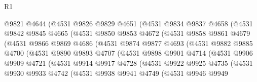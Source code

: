 \begin{lexlean}{R1}
\begin{coremodule}
                  @9821
                  @4644
                  (@4531
                    @9826
                    @9829
                    @4651
                    (@4531
                      @9834
                      @9837
                      @4658
                      (@4531
                        @9842
                        @9845
                        @4665
                        (@4531
                          @9850
                          @9853
                          @4672
                          (@4531
                            @9858
                            @9861
                            @4679
                            (@4531
                              @9866
                              @9869
                              @4686
                              (@4531
                                @9874
                                @9877
                                @4693
                                (@4531
                                  @9882
                                  @9885
                                  @4700
                                  (@4531
                                    @9890
                                    @9893
                                    @4707
                                    (@4531
                                      @9898
                                      @9901
                                      @4714
                                      (@4531
                                        @9906
                                        @9909
                                        @4721
                                        (@4531
                                          @9914
                                          @9917
                                          @4728
                                          (@4531
                                            @9922
                                            @9925
                                            @4735
                                            (@4531
                                              @9930
                                              @9933
                                              @4742
                                              (@4531
                                                @9938
                                                @9941
                                                @4749
                                                (@4531
                                                  @9946
                                                  @9949

\end{coremodule}
\end{lexlean}
